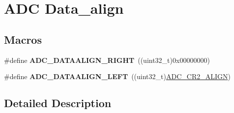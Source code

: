 \hypertarget{group___a_d_c___data__align}{\section{A\-D\-C Data\-\_\-align}
\label{group___a_d_c___data__align}
}
\subsection*{Macros}
\begin{DoxyCompactItemize}
\item 
\hypertarget{group___a_d_c___data__align_gafed5c0d327ad6d2cc0960f7943beb265}{\#define {\bfseries A\-D\-C\-\_\-\-D\-A\-T\-A\-A\-L\-I\-G\-N\-\_\-\-R\-I\-G\-H\-T}~((uint32\-\_\-t)0x00000000)}\label{group___a_d_c___data__align_gafed5c0d327ad6d2cc0960f7943beb265}

\item 
\hypertarget{group___a_d_c___data__align_ga8afeead661c1ffbc27a5405a254d60ba}{\#define {\bfseries A\-D\-C\-\_\-\-D\-A\-T\-A\-A\-L\-I\-G\-N\-\_\-\-L\-E\-F\-T}~((uint32\-\_\-t)\hyperlink{group___peripheral___registers___bits___definition_gaf5950b5a7438a447584f6dd86c343362}{A\-D\-C\-\_\-\-C\-R2\-\_\-\-A\-L\-I\-G\-N})}\label{group___a_d_c___data__align_ga8afeead661c1ffbc27a5405a254d60ba}

\end{DoxyCompactItemize}


\subsection{Detailed Description}
